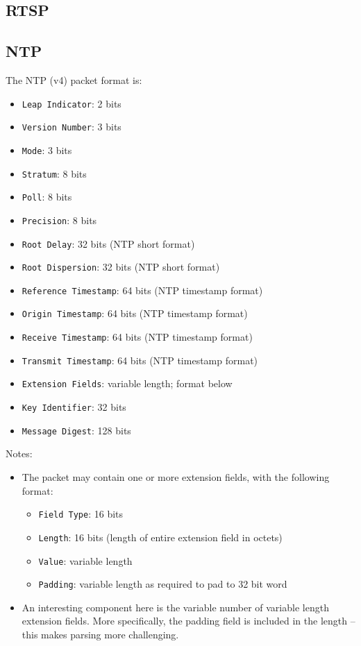 \documentclass[10pt,a4paper]{article}
\begin{document}
\subsection{RTSP}

\subsection{NTP}

The NTP (v4) packet format is:
\begin{itemize}
\item \texttt{Leap Indicator}: 2 bits
\item \texttt{Version Number}: 3 bits
\item \texttt{Mode}: 3 bits
\item \texttt{Stratum}: 8 bits
\item \texttt{Poll}: 8 bits
\item \texttt{Precision}: 8 bits
\item \texttt{Root Delay}: 32 bits (NTP short format)
\item \texttt{Root Dispersion}: 32 bits (NTP short format)
\item \texttt{Reference Timestamp}: 64 bits (NTP timestamp format)
\item \texttt{Origin Timestamp}: 64 bits (NTP timestamp format)
\item \texttt{Receive Timestamp}: 64 bits (NTP timestamp format)
\item \texttt{Transmit Timestamp}: 64 bits (NTP timestamp format)
\item \texttt{Extension Fields}: variable length; format below
\item \texttt{Key Identifier}: 32 bits
\item \texttt{Message Digest}: 128 bits
\end{itemize}

Notes:
\begin{itemize}
\item The packet may contain one or more extension fields, with the following format:
\begin{itemize}
\item \texttt{Field Type}: 16 bits
\item \texttt{Length}: 16 bits (length of entire extension field in octets)
\item \texttt{Value}: variable length
\item \texttt{Padding}: variable length as required to pad to 32 bit word
\end{itemize}
\item An interesting component here is the variable number of variable length extension
fields. More specifically, the padding field is included in the length -- this makes
parsing more challenging.
\end{itemize}
\end{document}
